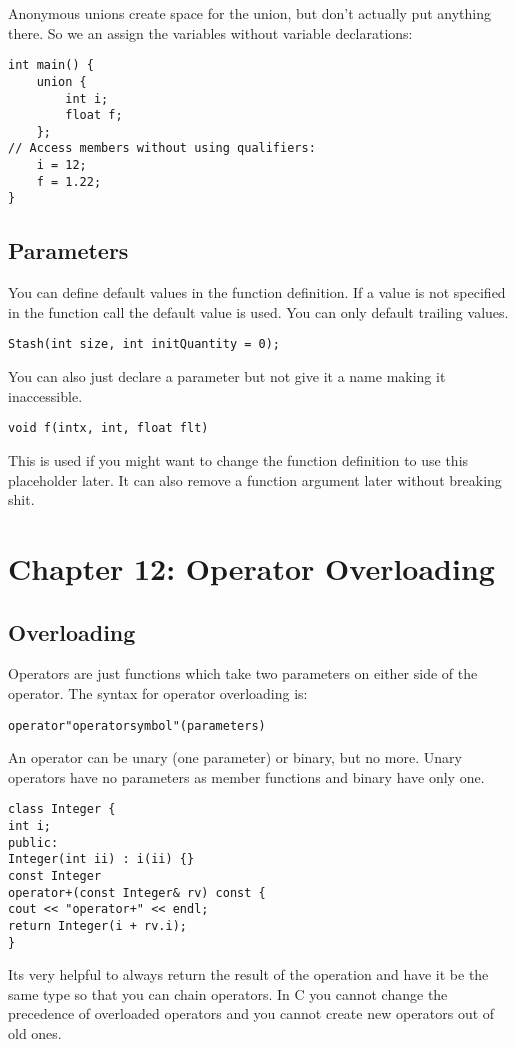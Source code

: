 \documentclass[12pt]{article}
\begin{document}
Anonymous unions create space for the union, but don't actually put anything there. So we an assign the variables without variable declarations:
\begin{lstlisting}
int main() {
	union {
	    int i;
		float f;
	};
// Access members without using qualifiers:
	i = 12;
	f = 1.22;
}
\end{lstlisting}

\subsection*{Parameters}
You can define default values in the function definition. If a value is not specified in the function call the default value is used. You can only default trailing values.
\begin{lstlisting}
Stash(int size, int initQuantity = 0);
\end{lstlisting}
You can also just declare a parameter but not give it a name making it inaccessible.
\begin{lstlisting}
void f(intx, int, float flt)
\end{lstlisting}
This is used if you might want to change the function definition to use this placeholder later. It can also remove a function argument later without breaking shit.

\section*{Chapter 12: Operator Overloading}
\subsection*{Overloading}
Operators are just functions which take two parameters on either side of the operator. The syntax for operator overloading is:
\begin{lstlisting}
operator"operatorsymbol"(parameters)
\end{lstlisting}
An operator can be unary (one parameter) or binary, but no more. Unary operators have no parameters as member functions and binary have only one.
\begin{lstlisting}
class Integer {
int i;
public:
Integer(int ii) : i(ii) {}
const Integer
operator+(const Integer& rv) const {
cout << "operator+" << endl;
return Integer(i + rv.i);
}
\end{lstlisting}
Its very helpful to always return the result of the operation and have it be the same type so that you can chain operators. In C you cannot change the precedence of overloaded operators and you cannot create new operators out of old ones.
\end{document}
